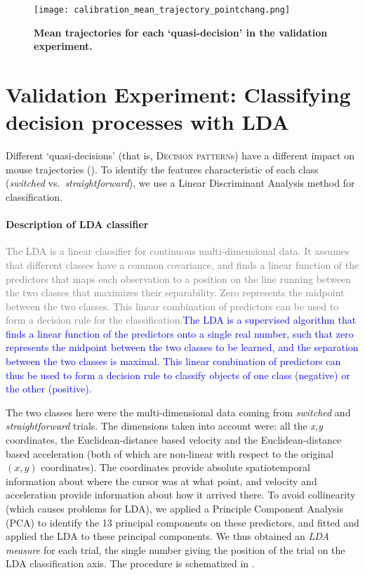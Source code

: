 \documentclass[draft]{article}
\newcommand{\changeEC}[2]{{\footnotesize\textcolor{gray}{#1}}\textcolor{blue}{#2}}
\begin{document}
\begin{figure}
\centering
\texttt{[image: calibration\_mean\_trajectory\_pointchang.png]}
\caption{\textbf{Mean trajectories for each `quasi-decision' in the validation experiment.}}\label{fig:mean.trajectories.calibration}
\end{figure}

\section{Validation Experiment: Classifying decision processes with LDA}
\label{section:LDA}
Different `quasi-decisions' (that is, \textsc{Decision pattern}s) have a different impact on mouse trajectories (). To identify the features characteristic of each class (\textit{switched} vs.\ \textit{straightforward}), we use a Linear Discriminant Analysis method for classification. 

\paragraph{Description of LDA classifier}
\changeEC{The LDA is a linear classifier for continuous multi-dimensional data. It assumes that different classes have a common covariance, and finds a linear function of the predictors that maps each observation to a position on the line running between the two classes that maximizes their separability. Zero represents the midpoint between the two classes. This linear combination of predictors can be used to form a decision rule for the classification.}{The LDA is a supervised algorithm that finds a linear function of the predictors onto a single real number, such that zero represents the midpoint between the two classes to be learned, and the separation between the two classes is maximal. This linear combination of predictors can thus be used to form a decision rule to classify objects of one class (negative) or the other (positive).}
 
The two classes here were the multi-dimensional data coming from \emph{switched} and \emph{straightforward} trials. The dimensions taken into account were: all the \textit{x,y} coordinates, the Euclidean-distance based velocity and the Euclidean-distance based acceleration (both of which are non-linear with respect to the original $(x,y)$ coordinates). The coordinates provide absolute spatiotemporal information about where the cursor was at what point, and velocity and acceleration provide information about how it arrived there.
To avoid collinearity (which causes problems for LDA), we applied a Principle Component Analysis (PCA) to identify the 13 principal components on these predictors, and fitted and applied the LDA to these principal components.
We thus obtained an \emph{LDA measure} for each trial, the single number giving the position of the trial on the LDA classification axis.
The procedure is schematized in .
\end{document}
